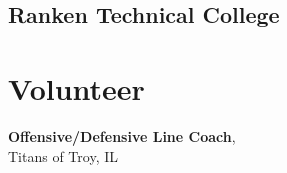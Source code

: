 \documentclass{TaylorTurnerResume2023}
\begin{document}
\begin{minipage}[t]{0.275\textwidth}
\subsection{Ranken Technical College}

\section{Volunteer} 
{\textbf{Offensive/Defensive Line Coach},\\
Titans of Troy, IL}






\end{minipage} 
\end{document}
